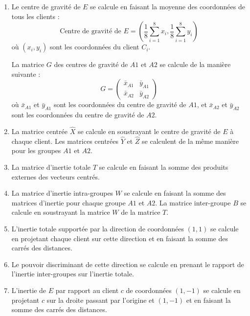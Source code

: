 \documentclass{article}
\begin{document}
\begin{enumerate}
    \item Le centre de gravité de \( E \) se calcule en faisant la moyenne des coordonnées de tous les clients :
    \[ \text{Centre de gravité de } E = \left( \frac{1}{8} \sum_{i=1}^{8} x_i, \frac{1}{8} \sum_{i=1}^{8} y_i \right) \]
    où \( (x_i, y_i) \) sont les coordonnées du client \( C_i \).
    
    La matrice \( G \) des centres de gravité de \( A1 \) et \( A2 \) se calcule de la manière suivante :
    \[
    G = \begin{pmatrix}
    \bar{x}_{A1} & \bar{y}_{A1} \\
    \bar{x}_{A2} & \bar{y}_{A2}
    \end{pmatrix}
    \]
    où \( \bar{x}_{A1} \) et \( \bar{y}_{A1} \) sont les coordonnées du centre de gravité de \( A1 \), et \( \bar{x}_{A2} \) et \( \bar{y}_{A2} \) sont les coordonnées du centre de gravité de \( A2 \).
    
    \item La matrice centrée \( \hat{X} \) se calcule en soustrayant le centre de gravité de \( E \) à chaque client. Les matrices centrées \( \hat{Y} \) et \( \hat{Z} \) se calculent de la même manière pour les groupes \( A1 \) et \( A2 \).
    
    \item La matrice d’inertie totale \( T \) se calcule en faisant la somme des produits externes des vecteurs centrés.
    
    \item La matrice d’inertie intra-groupes \( W \) se calcule en faisant la somme des matrices d’inertie pour chaque groupe \( A1 \) et \( A2 \). La matrice inter-groupe \( B \) se calcule en soustrayant la matrice \( W \) de la matrice \( T \).
    
    \item L'inertie totale supportée par la direction de coordonnées \( (1, 1) \) se calcule en projetant chaque client sur cette direction et en faisant la somme des carrés des distances.
    
    \item Le pouvoir discriminant de cette direction se calcule en prenant le rapport de l'inertie inter-groupes sur l'inertie totale.
    
    \item L'inertie de \( E \) par rapport au client \( c \) de coordonnées \( (1, -1) \) se calcule en projetant \( c \) sur la droite passant par l'origine et \( (1, -1) \) et en faisant la somme des carrés des distances.
\end{enumerate}
\end{document}
